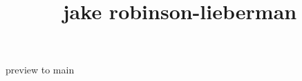 \documentclass[11pt, oneside]{article}
\title{jake robinson-lieberman}
\begin{document}
\maketitle

preview to main
\end{document}
